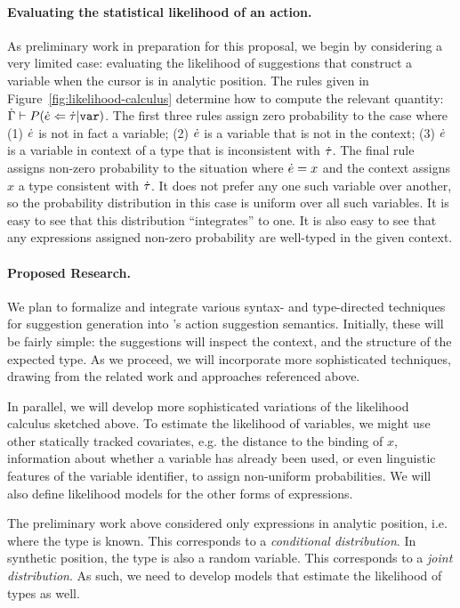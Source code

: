 \paragraph{Evaluating the statistical likelihood of an action.}
As preliminary work in preparation for this proposal, we begin by considering a
very limited case: evaluating the likelihood of suggestions that construct a  variable when the cursor is in analytic position. The rules given in
Figure~\ref{fig:likelihood-calculus} determine how to compute the relevant
quantity: $\dot{\Gamma} \vdash P(\dot{e} \Leftarrow \dot{\tau} \vert 
\texttt{var})$. The first three rules assign zero probability to the case where
(1) $\dot{e}$ is not in fact a variable; (2) $\dot{e}$ is a variable that is not in
the context; (3) $\dot{e}$ is a variable in context of a type that is inconsistent
with $\dot{\tau}$. The final rule assigns non-zero probability to the situation where
$\dot{e}=x$ and the context assigns $x$ a type consistent with $\dot{\tau}$. It does
not prefer any one such variable over another, so the probability distribution
in this case is uniform over all such variables. 
It is easy to see that this distribution ``integrates'' to one. It is also easy
to see that any expressions assigned non-zero probability are well-typed in the
given context.


\paragraph{Proposed Research.} We plan to formalize and integrate various
syntax- and type-directed techniques for suggestion generation into \HazelEnv's
action suggestion semantics. Initially, these will be fairly simple: the
suggestions will inspect the context, and the structure of the expected type. As
we proceed, we will incorporate more sophisticated techniques, drawing from the
related work and approaches referenced above.

In parallel, we will develop more sophisticated variations of the likelihood
calculus sketched above. To estimate the likelihood of variables, we might use
other statically tracked covariates, e.g. the distance to the binding of $x$,
information about whether a variable has already been used, or even linguistic
features of the variable identifier, to assign non-uniform probabilities. We
will also define likelihood models for the other forms of expressions.  

The preliminary work above considered only expressions in analytic position,
i.e. where the type is known. This corresponds to a \emph{conditional
  distribution}. In synthetic position, the type is also a random variable. This
corresponds to a \emph{joint distribution}. As such, we need to develop models
that estimate the likelihood of types as well.

